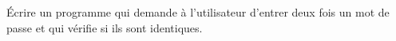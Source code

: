 
\begin{exercice}\label{exosmath-0589}

    Écrire un programme qui demande à l'utilisateur d'entrer deux fois un mot de passe et qui vérifie si ils sont identiques.

\end{exercice}
